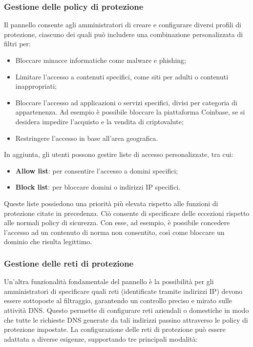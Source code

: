 \subsubsection{Gestione delle policy di protezione}
Il pannello consente agli amministratori di creare e configurare diversi profili di protezione, ciascuno dei quali può includere una combinazione personalizzata di filtri per:
\begin{itemize}
  \item Bloccare minacce informatiche come malware e phishing;
  \item Limitare l'accesso a contenuti specifici, come siti per adulti o contenuti inappropriati;
  \item Bloccare l'accesso ad applicazioni o servizi specifici, divisi per categoria di appartenenza. Ad esempio è possibile bloccare la piattaforma Coinbase, se si desidera impedire l'acquisto e la vendita di criptovalute;
  \item Restringere l'accesso in base all'area geografica.
\end{itemize}
In aggiunta, gli utenti possono gestire liste di accesso personalizzate, tra cui:
\begin{itemize}
  \item \textbf{Allow list}: per consentire l'accesso a domini specifici;
  \item \textbf{Block list}: per bloccare domini o indirizzi IP specifici.
\end{itemize}
Queste liste possiedono una priorità più elevata rispetto alle funzioni di protezione citate in precedenza. Ciò consente di specificare delle eccezioni rispetto alle normali policy di sicurezza. Con esse, ad esempio, è possibile concedere l'accesso ad un contenuto di norma non consentito, così come bloccare un dominio che risulta legittimo.

\subsubsection{Gestione delle reti di protezione}
Un'altra funzionalità fondamentale del pannello è la possibilità per gli amministratori di specificare quali reti (identificate tramite indirizzi IP) devono essere sottoposte al filtraggio, garantendo un controllo preciso e mirato sulle attività DNS. Questo permette di configurare reti aziendali o domestiche in modo che tutte le richieste DNS generate da tali indirizzi passino attraverso le policy di protezione impostate.  La configurazione delle reti di protezione può essere adattata a diverse esigenze, supportando tre principali modalità:

